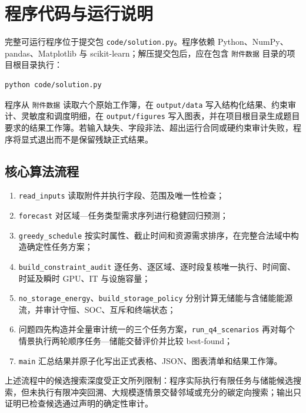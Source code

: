 \appendix
\section{程序代码与运行说明}

完整可运行程序位于提交包 \texttt{code/solution.py}。程序依赖 Python、NumPy、pandas、Matplotlib 与 scikit-learn；解压提交包后，应在包含 \texttt{附件数据} 目录的项目根目录执行：
\begin{verbatim}
python code/solution.py
\end{verbatim}
程序从 \texttt{附件数据} 读取六个原始工作簿，在 \texttt{output/data} 写入结构化结果、约束审计、灵敏度和调度明细，在 \texttt{output/figures} 写入图表，并在项目根目录生成题目要求的结果工作簿。若输入缺失、字段非法、超出运行合同或硬约束审计失败，程序将显式退出而不是保留残缺正式结果。

\subsection{核心算法流程}
\begin{enumerate}
\item \texttt{read\_inputs} 读取附件并执行字段、范围及唯一性检查；
\item \texttt{forecast} 对区域—任务类型需求序列进行稳健回归预测；
\item \texttt{greedy\_schedule} 按实时属性、截止时间和资源需求排序，在完整合法域中构造确定性任务方案；
\item \texttt{build\_constraint\_audit} 逐任务、逐区域、逐时段复核唯一执行、时间窗、时延及瞬时 GPU、IT 与设施容量；
\item \texttt{no\_storage\_energy}、\texttt{build\_storage\_policy} 分别计算无储能与含储能能源流，并审计守恒、SOC、互斥和终端状态；
\item 问题四先构造并全量审计统一的三个任务方案，\texttt{run\_q4\_scenarios} 再对每个情景执行两轮顺序任务—储能交替评价并比较 best-found；
\item \texttt{main} 汇总结果并原子化写出正式表格、JSON、图表清单和结果工作簿。
\end{enumerate}

上述流程中的候选搜索深度受正文所列限制：程序实际执行有限任务与储能候选搜索，但未执行有限冲突回溯、大规模逐情景交替邻域或充分的碳定向搜索；输出只证明已检查候选通过声明的确定性审计。
